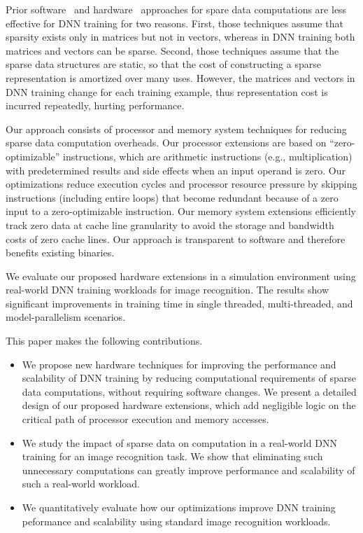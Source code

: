 Prior software~\cite{Eisenstat82, IntelSparseMatrix} and hardware~\cite{Carter99, Srinidhi12, Fowers13} approaches for spare data computations are less effective for DNN training for two reasons.  First, those techniques assume that sparsity exists only in matrices but not in vectors, whereas in DNN training both matrices and vectors can be sparse.  Second, those techniques assume that the sparse data structures are static, so that the cost of constructing a sparse representation is amortized over many uses.  However, the matrices and vectors in DNN training change for each training example, thus representation cost is incurred repeatedly, hurting performance. 

Our approach consists of processor and memory system techniques for reducing sparse data computation overheads.  Our processor extensions are based on ``zero-optimizable'' instructions, which are arithmetic instructions (e.g., multiplication) with predetermined results and side effects when an input operand is zero. Our optimizations reduce execution cycles and processor resource pressure by skipping instructions (including entire loops) that become redundant because of a zero input to a zero-optimizable instruction.  Our memory system extensions efficiently track zero data at cache line granularity to avoid the storage and bandwidth costs of zero cache lines.  Our approach is transparent to software and therefore benefits existing binaries. 

We evaluate our proposed hardware extensions in a simulation environment using real-world DNN training workloads for image recognition. The results show significant improvements in training time in single threaded, multi-threaded, and model-parallelism scenarios.

This paper makes the following contributions.
\begin{itemize}

\item We propose new hardware techniques for improving the performance and scalability of DNN training by reducing computational requirements of sparse data computations, without requiring software changes.  We present a detailed design of our proposed hardware extensions, which add negligible logic on the critical path of processor execution and memory accesses. 
\item We study the impact of sparse data on computation in a real-world DNN training for an image recognition task. We show that eliminating such unnecessary computations can greatly improve performance and scalability of such a real-world workload.
\item We quantitatively evaluate how our optimizations improve DNN training peformance and scalability using standard image recognition workloads. 

\end{itemize}

